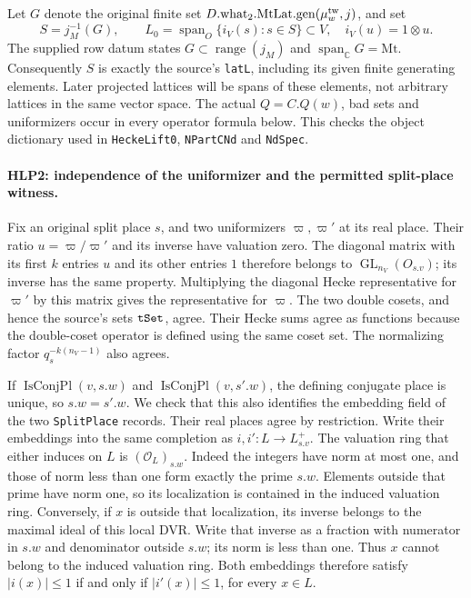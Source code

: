 Let \(G\) denote the original finite set
\(D.\mathrm{what}_2.\mathrm{MtLat.gen}(\mu^{\rm tw}_w,j)\), and set
\[
       S=j_M^{-1}(G),\qquad
       L_0=\operatorname{span}_O\{i_V(s):s\in S\}\subset V,
       \quad i_V(u)=1\otimes u.                     \tag{HLP.1}
\]
The supplied row datum states \(G\subset\operatorname{range}(j_M)\)
and \(\operatorname{span}_{\mathbb C}G=\mathrm{Mt}\). Consequently
\(S\) is exactly the source's \texttt{lat\allowbreak L}, including its given
finite generating elements. Later projected lattices will be spans
of these elements, not arbitrary lattices in the same vector space.
The actual \(Q=C.Q(w)\), bad sets and uniformizers occur in every
operator formula below. This checks the object dictionary used in
\texttt{Hecke\allowbreak Lift0}, \texttt{NPart\allowbreak CNd} and \texttt{Nd\allowbreak Spec}.

\paragraph{HLP2: independence of the uniformizer and the permitted split-place witness.}
\label{claim:HLP2}
Fix an original split place \(s\), and two uniformizers \(\varpi,\varpi'\)
at its real place. Their ratio \(u=\varpi/\varpi'\) and its inverse
have valuation zero. The diagonal matrix with its first \(k\) entries
\(u\) and its other entries \(1\) therefore belongs to
\(\operatorname{GL}_{n_V}(O_{s.v})\); its inverse has the same property.
Multiplying the diagonal Hecke representative for \(\varpi'\) by this
matrix gives the representative for \(\varpi\). The two double cosets,
and hence the source's sets \(\texttt{t\allowbreak Set}\), agree. Their Hecke sums
agree as functions because the double-coset operator is defined using
the same coset set. The normalizing factor \(q_s^{-k(n_V-1)}\) also
agrees.

If \(\operatorname{IsConjPl}(v,s.w)\) and
\(\operatorname{IsConjPl}(v,s'.w)\), the defining conjugate place is
unique, so \(s.w=s'.w\). We check that this also identifies the
embedding field of the two \texttt{Split\allowbreak Place} records. Their real
places agree by restriction. Write their embeddings into the same
completion as \(i,i':L\to L^+_{s.v}\). The valuation ring that either
induces on \(L\) is \((\mathcal O_L)_{s.w}\). Indeed the integers
have norm at most one, and those of norm less than one form exactly
the prime \(s.w\). Elements outside that prime have norm one, so
its localization is contained in the induced valuation ring.
Conversely, if \(x\) is outside that localization, its inverse
belongs to the maximal ideal of this local DVR. Write that inverse
as a fraction with numerator in \(s.w\) and denominator outside
\(s.w\); its norm is less than one. Thus \(x\) cannot belong to
the induced valuation ring. Both embeddings therefore satisfy
\(|i(x)|\le1\) if and only if \(|i'(x)|\le1\), for every \(x\in L\).

